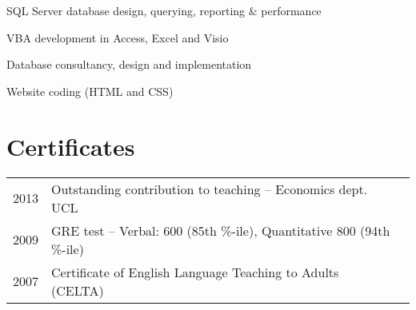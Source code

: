 \documentclass[a4paper]{deedy-resume} %
\begin{document}
\begin{minipage}[t]{0.66\textwidth}
    \sectionspace %



    \begin{tightitemize}
        \item SQL Server database design, querying, reporting \& performance
        \item VBA development in Access, Excel and Visio
    \end{tightitemize}

    \sectionspace %
    


    \begin{tightitemize}
        \item Database consultancy, design and implementation
        \item Website coding (HTML and CSS)
    \end{tightitemize}

    \sectionspace %
    

    \section{Certificates} 

    \begin{tabular}{rll}
        2013	 & Outstanding contribution to teaching -- Economics dept. UCL\\
        2009     & GRE test -- Verbal: 600 (85th \%-ile), Quantitative 800 (94th \%-ile) \\
        2007     & Certificate of English Language Teaching to Adults (CELTA)
    \end{tabular}

    \sectionspace %



\end{minipage}
\end{document}
